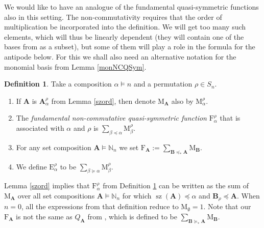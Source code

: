 \documentclass{article}
\theoremstyle{definition}
\newtheorem{defn}[thm]{Definition}
\begin{document}
We would like to have an analogue of the fundamental quasi-symmetric functions also in this setting. The non-commutativity requires that the order of multiplication be incorporated into the definition. We will get too many such elements, which will thus be linearly dependent (they will contain one of the bases from \cite{[BZ]} as a subset), but some of them will play a role in the formula for the antipode below. For this we shall also need an alternative notation for the monomial basis from Lemma \ref{monNCQSym}.
\begin{defn}
Take a composition $\alpha \vDash n$ and a permutation $\rho \in S_{n}$.
\begin{enumerate}[$(i)$]
\item If $\mathbf{A}$ is $\mathbf{A}_{\alpha}^{\rho}$ from Lemma \ref{szord}, then denote $\mathrm{M}_{\mathbf{A}}$ also by $\mathrm{M}_{\alpha}^{\rho}$.
\item The \emph{fundamental non-commutative quasi-symmetric function} $\mathrm{F}_{\alpha}^{\rho}$ that is associated with $\alpha$ and $\rho$ is $\sum_{\beta\preceq\alpha}\mathrm{M}_{\beta}^{\rho}$.
\item For any set composition $\mathbf{A}\vDash\mathbb{N}_{n}$ we set $\mathrm{F}_{\mathbf{A}}:=\sum_{\mathbf{B}\preceq_{*}\mathbf{A}}\mathrm{M}_{\mathbf{B}}$.
\item We define $\mathrm{E}_{\alpha}^{\rho}$ to be $\sum_{\beta\succeq\alpha}\mathrm{M}_{\beta}^{\rho}$.
\end{enumerate} \label{fundNCQSym}
\end{defn}
Lemma \ref{szord} implies that $\mathrm{F}_{\alpha}^{\rho}$ from Definition \ref{fundNCQSym} can be written as the sum of $\mathrm{M}_{\mathbf{A}}$ over all set compositions $\mathbf{A}\vDash\mathbb{N}_{n}$ for which $\operatorname{sz}(\mathbf{A})\preceq\alpha$ and $\mathbf{B}_{\rho}\preceq\mathbf{A}$. When $n=0$, all the expressions from that definition reduce to $\mathrm{M}_{\emptyset}=1$. Note that our $\mathrm{F}_{\mathbf{A}}$ is not the same as $Q_{\mathbf{A}}$ from \cite{[BZ]}, which is defined to be $\sum_{\mathbf{B}\succeq_{*}\mathbf{A}}\mathrm{M}_{\mathbf{B}}$.
\end{document}
